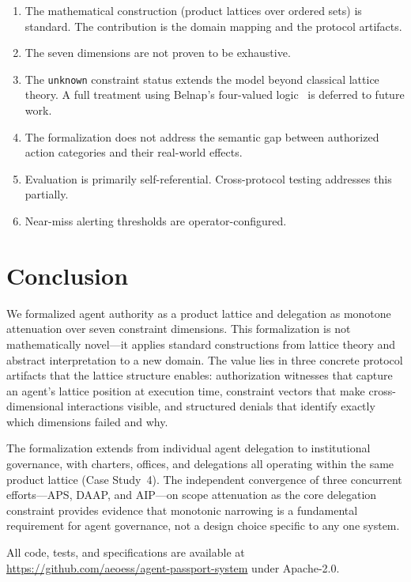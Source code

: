 \documentclass[sigconf,nonacm]{acmart}
\begin{document}
\begin{enumerate}
\item The mathematical construction (product lattices over ordered sets) is standard.
      The contribution is the domain mapping and the protocol artifacts.
\item The seven dimensions are not proven to be exhaustive.
\item The \texttt{unknown} constraint status extends the model beyond classical
      lattice theory. A full treatment using Belnap's four-valued logic~\cite{belnap1977}
      is deferred to future work.
\item The formalization does not address the semantic gap between authorized
      action categories and their real-world effects.
\item Evaluation is primarily self-referential. Cross-protocol testing addresses
      this partially.
\item Near-miss alerting thresholds are operator-configured.
\end{enumerate}

\section{Conclusion}

We formalized agent authority as a product lattice and delegation as monotone attenuation
over seven constraint dimensions. This formalization is not mathematically novel---it
applies standard constructions from lattice theory and abstract interpretation to a
new domain. The value lies in three concrete protocol artifacts that the lattice
structure enables: authorization witnesses that capture an agent's lattice position at
execution time, constraint vectors that make cross-dimensional interactions visible,
and structured denials that identify exactly which dimensions failed and why.

The formalization extends from individual agent delegation to institutional governance,
with charters, offices, and delegations all operating within the same product lattice
(Case Study~4). The independent convergence of three concurrent efforts---APS, DAAP, and
AIP---on scope attenuation as the core delegation constraint provides evidence that
monotonic narrowing is a fundamental requirement for agent governance, not a design
choice specific to any one system.

All code, tests, and specifications are available at
\url{https://github.com/aeoess/agent-passport-system} under Apache-2.0.
\end{document}

